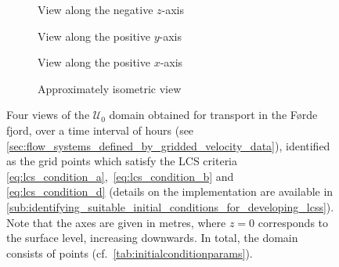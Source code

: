 \begin{figure}[htpb]
    \centering
    \begin{subfigure}[b]{0.475\textwidth}
        \centering
        \caption[]{{\small View along the negative $z$-axis}}
        \label{fig:fjord_abd_z}
    \end{subfigure}
    \begin{subfigure}[b]{0.475\textwidth}
        \centering
        \caption[]{{\small View along the positive $y$-axis}}
        \label{fig:fjord_abd_y}
    \end{subfigure}

    \begin{subfigure}[b]{0.475\textwidth}
        \centering
        \caption[]{{\small View along the positive $x$-axis}}
        \label{fig:fjord_abd_x}
    \end{subfigure}
    \begin{subfigure}[b]{0.475\textwidth}
        \centering
        \caption[]{{\small Approximately isometric view}}
        \label{fig:fjord_abd_isometric}
    \end{subfigure}
    \caption[Four views of the $\mathcal{U}_{0}$ domain obtained for transport
    in the Førde fjord]
    {
        Four views of the $\mathcal{U}_{0}$ domain obtained for transport in
        the Førde fjord, over a time interval of  hours
        (see \cref{sec:flow_systems_defined_by_gridded_velocity_data}),
        identified as the grid points which satisfy the
        LCS criteria \eqref{eq:lcs_condition_a},~\eqref{eq:lcs_condition_b} and~
        \eqref{eq:lcs_condition_d} (details on the implementation are available
        in
        \cref{sub:identifying_suitable_initial_conditions_for_developing_lcss}).
        Note that the axes are given in metres, where $z=0$ corresponds to
        the surface level, increasing downwards. In total, the domain consists
        of  points (cf.\ \cref{tab:initialconditionparams}).
}
    \label{fig:fjord_abd}
\end{figure}

